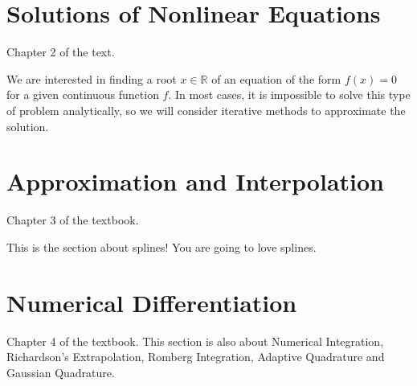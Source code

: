 \documentclass[12pt]{book}
\begin{document}






\chapter{Solutions of Nonlinear Equations} 
\begin{greenquote}
  Chapter 2 of the text.
\end{greenquote}

We are interested in finding a root $x \in \mathbb{R}$ of an equation of the
form $f(x) = 0$ for a given continuous function $f$. In most cases, it is
impossible to solve this type of problem analytically, so we will consider
iterative methods to approximate the solution.









\chapter{Approximation and Interpolation}
\begin{greenquote}
  Chapter 3 of the textbook.
\end{greenquote}

This is the section about splines! You are going to love splines.







\chapter{Numerical Differentiation}
\begin{greenquote}
  Chapter 4 of the textbook. This section is also about Numerical Integration,
  Richardson's Extrapolation, Romberg Integration, Adaptive Quadrature and
  Gaussian Quadrature.
\end{greenquote}













\end{document}

